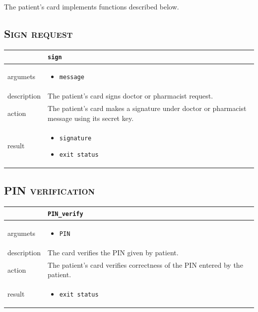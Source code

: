 \chapter {}


The patient's card implements functions described below.

\section{\textsc{Sign request}}

\begin{tabularx}{\textwidth}{ |p{2.5cm}|X| }
	\hline
	 &  \texttt{sign}\\
\hline	
argumets & 
\begin{itemize}
\item \texttt{message}
\end{itemize} \\
\hline
description & The patient's card signs doctor or pharmacist request.\\
\hline
action & 
The patient's card makes a signature under doctor or pharmacist message using its secret key.
\\
\hline
result &
\begin{itemize}
\item \texttt{signature}
\item \texttt{exit status}
\end{itemize}\\
\hline
\end{tabularx}

\section{\textsc{PIN verification}}

\begin{tabularx}{\textwidth}{ |p{2.5cm}|X| }
	\hline
	 &  \texttt{PIN\_verify}\\
\hline	
argumets & 
\begin{itemize}
\item \texttt{PIN}
\end{itemize} \\
\hline
description & 
The card verifies the PIN given by patient.\\
\hline
action & 
The patient's card verifies correctness of the PIN entered by the patient.\\
\hline
result &
\begin{itemize}
\item \texttt{exit status}
\end{itemize}\\
\hline
\end{tabularx}


